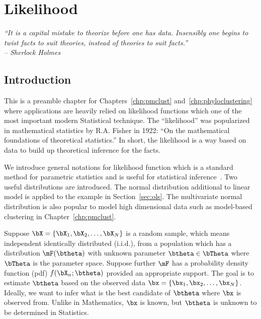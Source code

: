 
\chapter{Likelihood}
\label{chp:likelihood}


{\it
``It is a capital mistake to theorize before one has data.
Insensibly one begins to twist facts to suit theories,
instead of theories to suit facts.'' \\
\--- Sherlock Holmes
}


\section{Introduction}
\label{sec:likelihood_introduction}

This is a preamble chapter for Chapters~\ref{chp:pmclust}
and~\ref{chp:phyloclustering} where applications are heavily relied on
likelihood functions which one of the most
important modern Statistical technique.
The ``likelihood'' was popularized
in mathematical statistics by R.A. Fisher in 1922:
``On the mathematical foundations of theoretical
statistics.''\citep{Fisher1922}
In short, the likelihood is a way based on data to build up
theoretical inference for the facts.

We introduce general notations for likelihood function
which is a standard method for parametric statistics and is
useful for statistical inference~\citep{Casella2001}.
Two useful distributions are introduced.
The normal distribution additional to linear model is applied to
the example in Section~\ref{sec:ols}.
The multivariate normal
distribution
is also popular to model high dimensional data such as
model-based clustering in Chapter~\ref{chp:pmclust}.

Suppose $\bX = \{\bX_1, \bX_2, \ldots, \bX_N\}$ is a random sample,
which means independent identically distributed
(i.i.d.),
from a population which has a distribution $\mF(\btheta)$ with unknown
parameter $\btheta \in \bTheta$ where $\bTheta$ is the parameter space.
Suppose further $\mF$ has a probability density function
(pdf)
$f(\bX_n; \btheta)$ provided an appropriate support.
The goal is to estimate $\btheta$ based on the observed data
$\bx = \{\bx_1, \bx_2, \ldots, \bx_N\}$.
Ideally, we want to infer what is the best candidate of $\btheta$
where $\bx$ is observed from.
Unlike in Mathematics, $\bx$ is known, but $\btheta$ is unknown
to be determined in Statistics.

